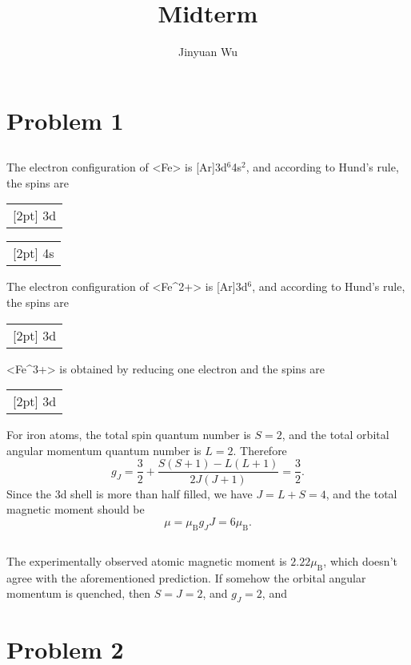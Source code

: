 \documentclass[hyperref, a4paper]{article}
\title{Midterm}
\author{Jinyuan Wu}
\def\\{}%
\def\ce#1{<#1>}%
\newcommand*{\muB}{\mu_{\text{B}}}
\newcommand*\up{\fbox{$\mathord\upharpoonleft\phantom{\downharpoonright}$}}%
\newcommand*\updn{\fbox{$\upharpoonleft\downharpoonright$}}%
\newcommand{\electron}[2]{{%
        \setlength\tabcolsep{0pt}%
        \begin{tabular}{c}
            \fboxsep=0pt\fbox{\fboxsep=3pt#2}\\[2pt]
            #1
        \end{tabular}%
}}
\begin{document}
\maketitle

\section{Problem 1}

\subsection{}

The electron configuration of \ce{Fe} is [Ar]3d$^6$4s$^2$,
and according to Hund's rule, 
the spins are 
\begin{center}
    \electron{3d}{\updn \up \up \up \up} \electron{4s}{\updn}
\end{center}
The electron configuration of \ce{Fe^{2+}} is [Ar]3d$^6$,
and according to Hund's rule, 
the spins are 
\begin{center}  
    \electron{3d}{\updn \up \up \up \up}
\end{center}
\ce{Fe^{3+}} is obtained by reducing one electron and the spins are 
\begin{center}
    \electron{3d}{\up \up \up \up \up}
\end{center}

For iron atoms,
the total spin quantum number is $S = 2$,
and the total orbital angular momentum quantum number is $L = 2$.
Therefore 
\begin{equation}
    g_J = \frac{3}{2} + \frac{S(S+1) - L(L+1)}{2J(J+1)} = \frac{3}{2}.
\end{equation}
Since the 3d shell is more than half filled, 
we have $J = L + S = 4$,
and the total magnetic moment should be 
\begin{equation}
    \mu = \muB g_J J = 6 \muB.
\end{equation}

\subsection{}

The experimentally observed atomic magnetic moment is $2.22\muB$,
which doesn't agree with the aforementioned prediction.
If somehow the orbital angular momentum is quenched, 
then $S = J = 2$,
and $g_J = 2$, 
and 


\section{Problem 2}
\end{document}
